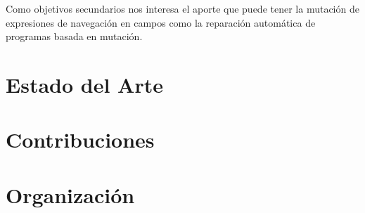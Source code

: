 Como objetivos secundarios nos interesa el aporte que puede tener la mutaci\'on de expresiones de navegaci\'on en campos como la reparaci\'on autom\'atica de programas basada en mutaci\'on.


\section{Estado del Arte}
\label{sec:intro.estado-del-arte}

\section{Contribuciones}
\label{sec:intro.contribuciones}



\section{Organizaci\'on}
\label{sec:intro.organizacion}


